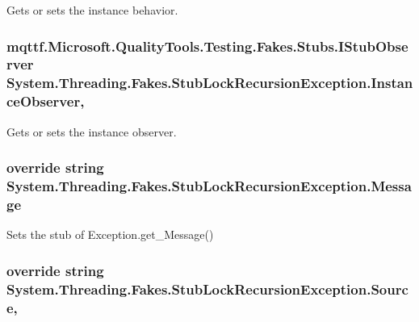 Gets or sets the instance behavior.

\hypertarget{class_system_1_1_threading_1_1_fakes_1_1_stub_lock_recursion_exception_aa73a3d33cfa1960361ca70a0c27d8a8d}{
\subsubsection[{Instance\-Observer}]{\setlength{\rightskip}{0pt plus 5cm}mqttf.\-Microsoft.\-Quality\-Tools.\-Testing.\-Fakes.\-Stubs.\-I\-Stub\-Observer System.\-Threading.\-Fakes.\-Stub\-Lock\-Recursion\-Exception.\-Instance\-Observer\hspace{0.3cm}{\ttfamily [get]}, {\ttfamily [set]}}}\label{class_system_1_1_threading_1_1_fakes_1_1_stub_lock_recursion_exception_aa73a3d33cfa1960361ca70a0c27d8a8d}


Gets or sets the instance observer.

\hypertarget{class_system_1_1_threading_1_1_fakes_1_1_stub_lock_recursion_exception_a16b7438b4d03fa910bfee95df68cd4a8}{
\subsubsection[{Message}]{\setlength{\rightskip}{0pt plus 5cm}override string System.\-Threading.\-Fakes.\-Stub\-Lock\-Recursion\-Exception.\-Message\hspace{0.3cm}{\ttfamily [get]}}}\label{class_system_1_1_threading_1_1_fakes_1_1_stub_lock_recursion_exception_a16b7438b4d03fa910bfee95df68cd4a8}


Sets the stub of Exception.\-get\-\_\-\-Message()

\hypertarget{class_system_1_1_threading_1_1_fakes_1_1_stub_lock_recursion_exception_aa19e449ed19bd048efd68e5d48a51442}{
\subsubsection[{Source}]{\setlength{\rightskip}{0pt plus 5cm}override string System.\-Threading.\-Fakes.\-Stub\-Lock\-Recursion\-Exception.\-Source\hspace{0.3cm}{\ttfamily [get]}, {\ttfamily [set]}}}\label{class_system_1_1_threading_1_1_fakes_1_1_stub_lock_recursion_exception_aa19e449ed19bd048efd68e5d48a51442}


